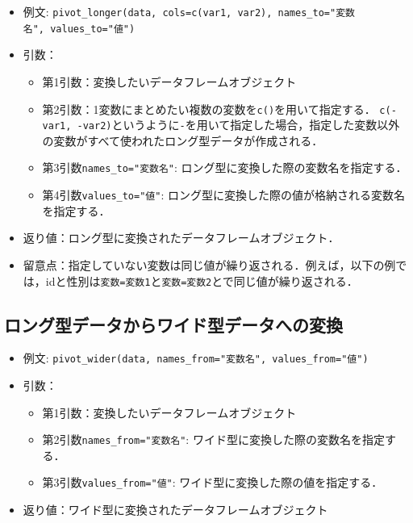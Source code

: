 \documentclass[
  xelatex, ja=standard]{bxjsarticle}
\providecommand{\tightlist}{%
  \setlength{\itemsep}{0pt}\setlength{\parskip}{0pt}}
\begin{document}
\begin{itemize}
\tightlist
\item
  例文:
  \texttt{pivot\_longer(data,\ cols=c(var1,\ var2),\ names\_to="変数名",\ values\_to="値")}
\item
  引数：

  \begin{itemize}
  \tightlist
  \item
    第1引数：変換したいデータフレームオブジェクト
  \item
    第2引数：1変数にまとめたい複数の変数を\texttt{c()}を用いて指定する．
    \texttt{c(-var1,\ -var2)}というように\texttt{-}を用いて指定した場合，指定した変数以外の変数がすべて使われたロング型データが作成される．
  \item
    第3引数\texttt{names\_to="変数名"}:
    ロング型に変換した際の変数名を指定する．
  \item
    第4引数\texttt{values\_to="値"}:
    ロング型に変換した際の値が格納される変数名を指定する．
  \end{itemize}
\item
  返り値：ロング型に変換されたデータフレームオブジェクト．
\item
  留意点：指定していない変数は同じ値が繰り返される．例えば，以下の例では，idと性別は\texttt{変数=変数1}と\texttt{変数=変数2}とで同じ値が繰り返される．
\end{itemize}

\subsection{ロング型データからワイド型データへの変換}\label{ux30edux30f3ux30b0ux578bux30c7ux30fcux30bfux304bux3089ux30efux30a4ux30c9ux578bux30c7ux30fcux30bfux3078ux306eux5909ux63db}

\begin{itemize}
\tightlist
\item
  例文:
  \texttt{pivot\_wider(data,\ names\_from="変数名",\ values\_from="値")}
\item
  引数：

  \begin{itemize}
  \tightlist
  \item
    第1引数：変換したいデータフレームオブジェクト
  \item
    第2引数\texttt{names\_from="変数名"}:
    ワイド型に変換した際の変数名を指定する．
  \item
    第3引数\texttt{values\_from="値"}:
    ワイド型に変換した際の値を指定する．
  \end{itemize}
\item
  返り値：ワイド型に変換されたデータフレームオブジェクト
\end{itemize}
\end{document}
